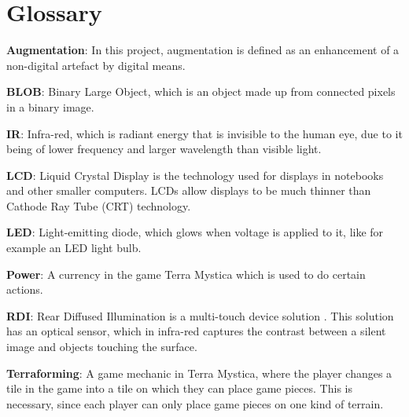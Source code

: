 \chapter*{Glossary}\label{gloss}

\textbf{Augmentation}: In this project, augmentation is defined as an enhancement of a non-digital artefact by digital means.

\textbf{BLOB}: Binary Large Object, which is an object made up from connected pixels in a binary image.

\textbf{IR}: Infra-red, which is radiant energy that is invisible to the human eye, due to it being of lower frequency and larger wavelength than visible light.

\textbf{LCD}: Liquid Crystal Display is the technology used for displays in notebooks and other smaller computers. LCDs allow displays to be much thinner than Cathode Ray Tube (CRT) technology.

\textbf{LED}: Light-emitting diode, which glows when voltage is applied to it, like for example an LED light bulb.

\textbf{Power}: A currency in the game Terra Mystica which is used to do certain actions.

\textbf{RDI}: Rear Diffused Illumination is a multi-touch device solution \citep{multiTT}. This solution has an optical sensor, which in infra-red captures the contrast between a silent image and objects touching the surface.

\textbf{Terraforming}: A game mechanic in Terra Mystica, where the player changes a tile in the game into a tile  on which they can place game pieces. This is necessary, since each player can only place game pieces on one kind of terrain.


